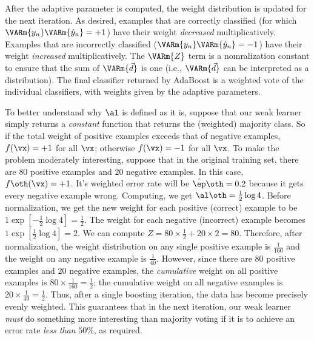 After the adaptive parameter is computed, the weight distribution is
updated for the next iteration.  As desired, examples that are
correctly classified (for which $\VARm{y_n} \VARm{\hat y_n} = +1$)
have their weight \emph{decreased} multiplicatively.  Examples that
are incorrectly classified ($\VARm{y_n} \VARm{\hat y_n} = -1$) have
their weight \emph{increased} multiplicatively.  The $\VARm{Z}$ term
is a nomralization constant to ensure that the sum of $\VARm{\vec d}$
is one (i.e., $\VARm{\vec d}$ can be interpreted as a distribution).
The final classifier returned by AdaBoost is a weighted vote of the
individual classifiers, with weights given by the adaptive parameters.

To better understand why $\al$ is defined as it is, suppose that our
weak learner simply returns a \emph{constant} function that returns
the (weighted) majority class.  So if the total weight of positive
examples exceeds that of negative examples, $f(\vx) = +1$ for all
$\vx$; otherwise $f(\vx) = -1$ for all $\vx$.  To make the problem
moderately interesting, suppose that in the original training set,
there are $80$ positive examples and $20$ negative examples.  In this
case, $f\oth(\vx)=+1$.  It's weighted error rate will be $\hat\ep\oth
= 0.2$ because it gets every negative example wrong.  Computing, we
get $\al\oth = \frac12\log 4$.  Before normalization, we get the new
weight for each positive (correct) example to be $1 \exp[-\frac12\log
4] = \frac12$.  The weight for each negative (incorrect) example
becomes $1 \exp[\frac12\log 4] = 2$.  We can compute $Z = 80 \times
\frac 1 2 + 20 \times 2 = 80$.  Therefore, after normalization, the
weight distribution on any single positive example is $\frac 1 {160}$
and the weight on any negative example is $\frac 1 {40}$.  However,
since there are $80$ positive examples and $20$ negative examples, the
\emph{cumulative} weight on all positive examples is $80 \times \frac
1 {160} = \frac 1 2$; the cumulative weight on all negative examples
is $20 \times \frac 1{40} = \frac12$.  Thus, after a single boosting
iteration, the data has become precisely evenly weighted.  This
guarantees that in the next iteration, our weak learner \emph{must} do
something more interesting than majority voting if it is to achieve an
error rate \emph{less than} $50\%$, as required.


